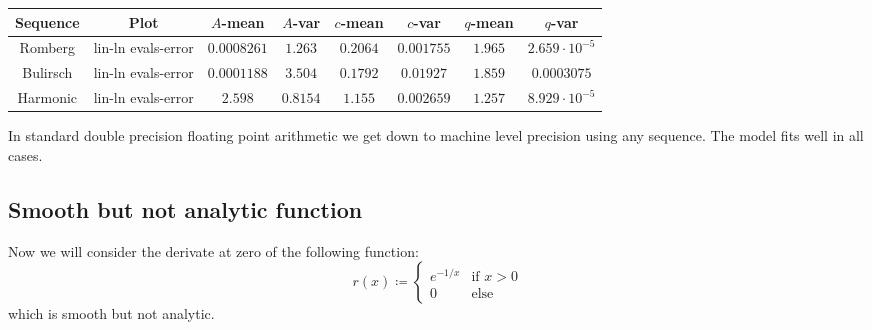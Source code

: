 \begin{table}[H]
    \centering
    \small
    \begin{tabular}{c|c||c|c|c|c|c|c}
Sequence & Plot & \(A\)-mean & \(A\)-var & \(c\)-mean & \(c\)-var & \(q\)-mean & \(q\)-var\\\hline
\rowcolor{green}
Romberg & lin-ln evals-error & \(0.0008261\) & \(1.263\) & \(0.2064\) & \(0.001755\) & \(1.965\) & \(2.659\cdot 10^{-5}\) \\
\rowcolor{green}
Bulirsch & lin-ln evals-error & \(0.0001188\) & \(3.504\) & \(0.1792\) & \(0.01927\) & \(1.859\) & \(0.0003075\) \\
\rowcolor{red}
Harmonic & lin-ln evals-error & \(2.598\) & \(0.8154\) & \(1.155\) & \(0.002659\) & \(1.257\) & \(8.929\cdot 10^{-5}\) \\
    \end{tabular}
    \label{tab:my_label}
\end{table}

In standard double precision floating point arithmetic we get down to machine level precision using any sequence. The model fits well in all cases.

\subsection{Smooth but not analytic function}

Now we will consider the derivate at zero of the following function:
\[
r(x) \coloneqq \begin{cases}
e^{-1/x} & \text{if } x > 0\\
0 & \text{else}
\end{cases}
\]
which is smooth but not analytic.

